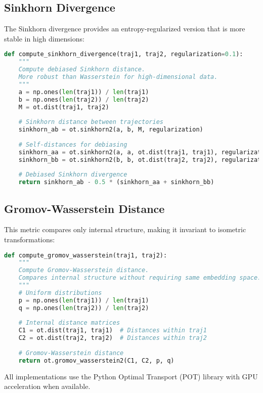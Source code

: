 \documentclass[11pt,letterpaper]{article}
\begin{document}
\subsection{Sinkhorn Divergence}

The Sinkhorn divergence provides an entropy-regularized version that is more stable in high dimensions:

\begin{lstlisting}[language=Python]
def compute_sinkhorn_divergence(traj1, traj2, regularization=0.1):
    """
    Compute debiased Sinkhorn distance.
    More robust than Wasserstein for high-dimensional data.
    """
    a = np.ones(len(traj1)) / len(traj1)
    b = np.ones(len(traj2)) / len(traj2)
    M = ot.dist(traj1, traj2)
    
    # Sinkhorn distance between trajectories
    sinkhorn_ab = ot.sinkhorn2(a, b, M, regularization)
    
    # Self-distances for debiasing
    sinkhorn_aa = ot.sinkhorn2(a, a, ot.dist(traj1, traj1), regularization)
    sinkhorn_bb = ot.sinkhorn2(b, b, ot.dist(traj2, traj2), regularization)
    
    # Debiased Sinkhorn divergence
    return sinkhorn_ab - 0.5 * (sinkhorn_aa + sinkhorn_bb)
\end{lstlisting}

\subsection{Gromov-Wasserstein Distance}

This metric compares only internal structure, making it invariant to isometric transformations:

\begin{lstlisting}[language=Python]
def compute_gromov_wasserstein(traj1, traj2):
    """
    Compute Gromov-Wasserstein distance.
    Compares internal structure without requiring same embedding space.
    """
    # Uniform distributions
    p = np.ones(len(traj1)) / len(traj1)
    q = np.ones(len(traj2)) / len(traj2)
    
    # Internal distance matrices
    C1 = ot.dist(traj1, traj1)  # Distances within traj1
    C2 = ot.dist(traj2, traj2)  # Distances within traj2
    
    # Gromov-Wasserstein distance
    return ot.gromov_wasserstein2(C1, C2, p, q)
\end{lstlisting}

All implementations use the Python Optimal Transport (POT) library with GPU acceleration when available.
\end{document}
